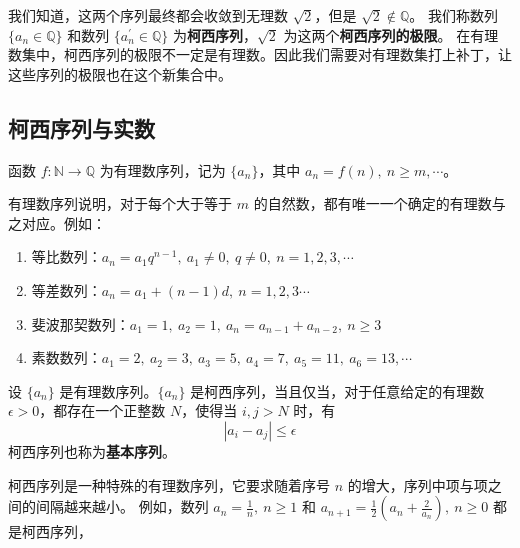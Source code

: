 \begin{note}
    我们知道，这两个序列最终都会收敛到无理数 $ \sqrt{2} $，但是 $ \sqrt{2}\notin\mathbb{Q} $。
    我们称数列 $ \{a_n\in\mathbb{Q}\} $ 和数列 $ \{a_n^{\prime}\in\mathbb{Q}\} $ 为\textbf{柯西序列}，$ \sqrt{2} $ 为这两个\textbf{柯西序列的极限}。
    在有理数集中，柯西序列的极限不一定是有理数。因此我们需要对有理数集打上补丁，让这些序列的极限也在这个新集合中。
\end{note}
\vspace{1em}

\subsection{柯西序列与实数}


\begin{definition}
    函数 $f:\mathbb{N}\to\mathbb{Q}$ 为有理数序列，记为 $\{a_n\}$，其中 $a_n=f(n),\ n\ge m,\cdots$。
\end{definition}
\begin{note}
    有理数序列说明，对于每个大于等于 $m$ 的自然数，都有唯一一个确定的有理数与之对应。例如：
    \begin{enumerate}
        \item 等比数列：$a_n = a_1q^{n-1},\ a_1\neq 0,\ q\neq 0,\ n=1,2,3,\cdots$
        \item 等差数列：$a_n = a_1 + (n-1)d,\ n=1,2,3\cdots$
        \item 斐波那契数列：$a_1=1,\ a_2=1,\ a_n=a_{n-1}+a_{n-2},\ n\ge 3$
        \item 素数数列：$a_1=2,\ a_2=3,\ a_3=5,\ a_4=7,\ a_5=11,\ a_6=13,\cdots$
    \end{enumerate}
\end{note}
\vspace{1em}

\begin{definition}
    设 $\{a_n\}$ 是有理数序列。$\{a_n\}$ 是柯西序列，当且仅当，对于任意给定的有理数 $\epsilon>0$，都存在一个正整数 $N$，使得当 $i,j>N$ 时，有
    \[
        |a_i - a_j| \le \epsilon
    \]
    柯西序列也称为\textbf{基本序列}。
\end{definition}
\begin{note}
    柯西序列是一种特殊的有理数序列，它要求随着序号 $n$ 的增大，序列中项与项之间的间隔越来越小。
    例如，数列 $a_n = \frac{1}{n},\ n\ge 1$ 和 $a_{n+1} = \frac{1}{2}(a_n+\frac{2}{a_n}),\ n\ge 0$ 都是柯西序列，
\end{note}
\vspace{1em}

